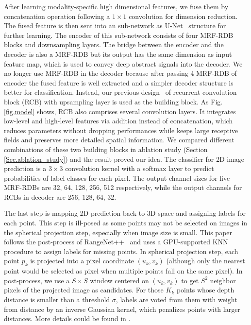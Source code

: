 \documentclass[preprint,review,3p]{elsarticle}
\begin{document}
After learning modality-specific high dimensional features, we fuse them by concatenation operation following a $1\times1$ convolution for dimension reduction. 
The fused feature is then sent into an sub-network as U-Net~\cite{ronneberger2015u} structure for further learning. The encoder of this sub-network consists of four MRF-RDB blocks and downsampling layers. The bridge between the encoder and the decoder is also a MRF-RDB but its output has the same dimension as input feature map, which is used to convey deep abstract signals into the decoder. 
We no longer use MRF-RDB in the decoder because after passing 4 MRF-RDB of encoder the fused feature is well extracted and a simpler decoder structure is better for classification. Instead, our previous design~\cite{yang2019road} of recurrent convolution block (RCB) with upsampling layer is used as the building block. As Fig. \ref{fig.model} shows, RCB also comprises several convolution layers. It integrates low-level and high-level features via addition instead of concatenation, which reduces parameters without dropping performances while keeps large receptive fields and preserves more detailed spatial information. We compared different combinations of these two building blocks in ablation study  (Section \ref{Sec.ablation_study}) and the result proved our idea. The classifier for 2D image prediction is a $3\times3$ convolution kernel with a softmax layer to predict probabilities of label classes for each pixel. The output channel sizes for five MRF-RDBs are 32, 64, 128, 256, 512 respectively, while the output channels for RCBs in decoder are 256, 128, 64, 32. 

The last step is mapping 2D prediction back to 3D space and assigning labels for each point. This step is ill-posed as some points may not be selected on images in the spherical projection step, especially when image size is small. This paper follows the post-process of RangeNet++~\cite{milioto2019rangenet++} and uses a GPU-supported KNN procedure to assign labels for missing points. In spherical projection step, each point $p_k$ is projected into a pixel coordinate $(u_k, v_k)$ (although only the nearest point would be selected as pixel when multiple points fall on the same pixel). In post-process, we use a $S\times S$ window centered on $(u_k, v_k)$ to get $S^2$ neighbor pixels of the projected image as candidates. For those $K_k$ points whose depth distance is smaller than a threshold $\sigma$, labels are voted from them with weight from distance by an inverse Gaussian kernel, which penalizes points with larger distances. More details could be found in \cite{milioto2019rangenet++}.
\end{document}
